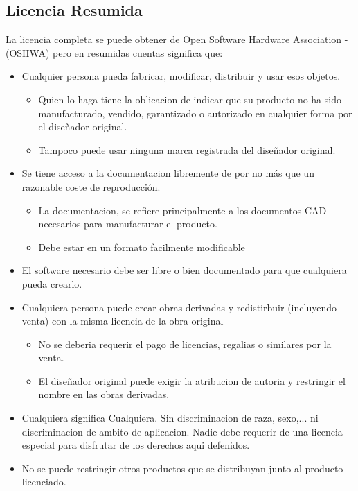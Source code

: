 \subsection{Licencia Resumida}
La licencia completa se puede obtener de \href{https://www.oshwa.org/definition/spanish/}{Open Software
Hardware Association - (OSHWA)} pero en resumidas cuentas significa que:
\begin{itemize}
    \item Cualquier persona pueda fabricar, modificar, distribuir y usar esos objetos.
    \begin{itemize}
        \item Quien lo haga tiene la oblicacion de indicar que su producto no ha sido
manufacturado, vendido, garantizado o autorizado en cualquier forma por el diseñador original.
        \item Tampoco puede usar ninguna marca registrada del diseñador original.
    \end{itemize}
    \item Se tiene acceso a la documentacion libremente de por no más que un razonable coste de reproducción.
    \begin{itemize}
        \item La documentacion, se refiere principalmente a los documentos CAD necesarios para manufacturar
        el producto.
        \item Debe estar en un formato facilmente modificable
    \end{itemize}
    \item El software necesario debe ser libre o bien
    documentado para que cualquiera pueda crearlo.
    \item Cualquiera persona puede crear obras derivadas y redistirbuir (incluyendo venta) con la misma licencia
de la obra original
    \begin{itemize}
        \item No se deberia requerir el pago de licencias, regalias o similares por la venta.
        \item El diseñador original puede exigir la atribucion de autoria y restringir el nombre en las obras
derivadas.
    \end{itemize}
    \item Cualquiera significa Cualquiera. Sin discriminacion de raza, sexo,... ni discriminacion de ambito
de aplicacion. Nadie debe requerir de una licencia especial para disfrutar de los derechos aqui defenidos.
    \item No se puede restringir otros productos que se distribuyan junto al producto licenciado. 

\end{itemize}

